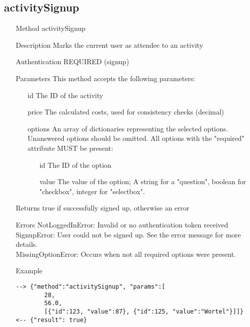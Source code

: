 \documentclass[a4paper]{scrreprt}
\begin{document}
\subsection{activitySignup}
\begin{enumerate}
\item[Method] activitySignup
\item[Description] Marks the current user as attendee to an activity
\item[Authentication] REQUIRED (signup)
\item[Parameters] This method accepts the following parameters:
\begin{enumerate}
	\item[id] The ID of the activity
    \item[price] The calculated costs, used for consistency checks (decimal)
    \item[options] An array of dictionaries representing the selected options. Unanswered options should be omitted. All options with the "required" attribute MUST be present:
	\begin{enumerate}
    	\item[id] The ID of the option
        \item[value] The value of the option; A string for a "question", boolean for "checkbox", integer for "selectbox".
        \end{enumerate}
    \end{enumerate}
\item[Returns] true if successfully signed up, otherwise an error
\item[Errors]
	NotLoggedInError: Invalid or no authentication token received \\
	SignupError: User could not be signed up. See the error message for more details. \\
    MissingOptionError: Occurs when not all required options were present.
\item[Example]
\begin{lstlisting}
--> {"method":"activitySignup", "params":[
        28,
        56.0,
        [{"id":123, "value":87}, {"id":125, "value":"Wortel"}]]}
<-- {"result": true}
\end{lstlisting}
\end{enumerate}
\end{document}
